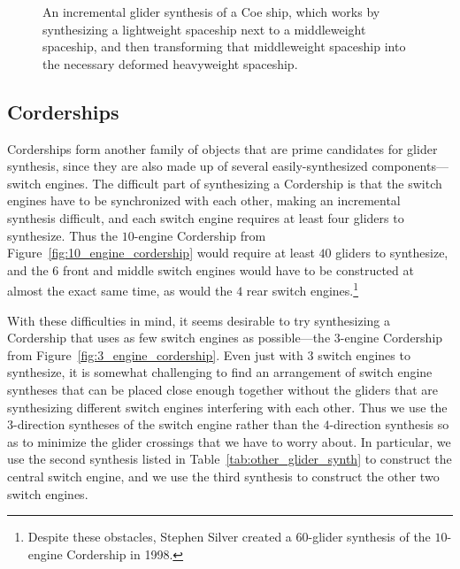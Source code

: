 \begin{figure}[!ht]
	\centering
	
	\caption{An incremental glider synthesis of a Coe ship, which works by synthesizing a lightweight spaceship next to a middleweight spaceship, and then transforming that middleweight spaceship into the necessary deformed heavyweight spaceship.}\label{fig:coe_ship_synth}
\end{figure}



\subsection{Corderships}\label{sec:incremental_schick}

Corderships form another family of objects that are prime candidates for glider synthesis, since they are also made up of several easily-synthesized components---switch engines. The difficult part of synthesizing a Cordership is that the switch engines have to be synchronized with each other, making an incremental synthesis difficult, and each switch engine requires at least four gliders to synthesize. Thus the $10$-engine Cordership from Figure~\ref{fig:10_engine_cordership} would require at least $40$ gliders to synthesize, and the $6$ front and middle switch engines would have to be constructed at almost the exact same time, as would the $4$ rear switch engines.\footnote{Despite these obstacles, Stephen Silver created a $60$-glider synthesis of the $10$-engine Cordership in 1998.}

With these difficulties in mind, it seems desirable to try synthesizing a Cordership that uses as few switch engines as possible---the $3$-engine Cordership from Figure~\ref{fig:3_engine_cordership}. Even just with $3$ switch engines to synthesize, it is somewhat challenging to find an arrangement of switch engine syntheses that can be placed close enough together without the gliders that are synthesizing different switch engines interfering with each other. Thus we use the $3$-direction syntheses of the switch engine rather than the $4$-direction synthesis so as to minimize the glider crossings that we have to worry about. In particular, we use the second synthesis listed in Table~\ref{tab:other_glider_synth} to construct the central switch engine, and we use the third synthesis to construct the other two switch engines.

